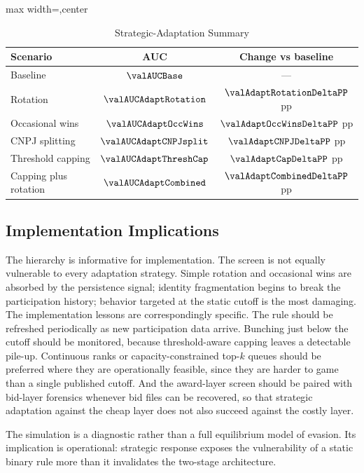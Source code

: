 \begin{table}[htbp]
\centering
\caption{Strategic-Adaptation Summary}
\label{tab:adaptation_summary_submission}
\footnotesize
\begin{adjustbox}{max width=\textwidth,center}
\begin{tabular}{p{4.4cm}cc}
\toprule
Scenario & AUC & Change vs baseline \\
\midrule
Baseline & $\valAUCBase$ & --- \\
Rotation & $\valAUCAdaptRotation$ & $\valAdaptRotationDeltaPP$ pp \\
Occasional wins & $\valAUCAdaptOccWins$ & $\valAdaptOccWinsDeltaPP$ pp \\
CNPJ splitting & $\valAUCAdaptCNPJsplit$ & $\valAdaptCNPJDeltaPP$ pp \\
Threshold capping & $\valAUCAdaptThreshCap$ & $\valAdaptCapDeltaPP$ pp \\
Capping plus rotation & $\valAUCAdaptCombined$ & $\valAdaptCombinedDeltaPP$ pp \\
\bottomrule
\end{tabular}
\end{adjustbox}
\end{table}

\subsection{Implementation Implications}
\label{app:adaptation_implementation_submission}

The hierarchy is informative for implementation. The screen is
not equally vulnerable to every adaptation strategy. Simple
rotation and occasional wins are absorbed by the persistence
signal; identity fragmentation begins to break the participation
history; behavior targeted at the static cutoff is the most
damaging. The implementation lessons are correspondingly
specific. The rule should be refreshed periodically as new
participation data arrive. Bunching just below the cutoff should
be monitored, because threshold-aware capping leaves a
detectable pile-up. Continuous ranks or capacity-constrained
top-$k$ queues should be preferred where they are operationally
feasible, since they are harder to game than a single published
cutoff. And the award-layer screen should be paired with
bid-layer forensics whenever bid files can be recovered, so
that strategic adaptation against the cheap layer does not also
succeed against the costly layer.

The simulation is a diagnostic rather than a full equilibrium
model of evasion. Its implication is operational: strategic
response exposes the vulnerability of a static binary rule more
than it invalidates the two-stage architecture.
